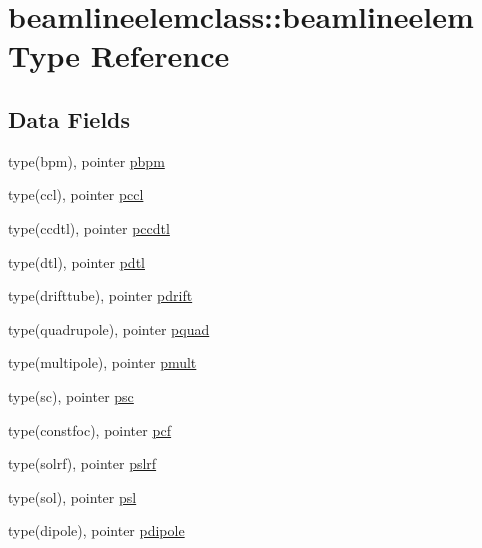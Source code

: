 \hypertarget{structbeamlineelemclass_1_1beamlineelem}{}\section{beamlineelemclass\+::beamlineelem Type Reference}
\label{structbeamlineelemclass_1_1beamlineelem}
\subsection*{Data Fields}
\begin{DoxyCompactItemize}
\item 
type(bpm), pointer \mbox{\hyperlink{structbeamlineelemclass_1_1beamlineelem_ab1486848bf9231eeed15a83170442e32}{pbpm}}
\item 
type(ccl), pointer \mbox{\hyperlink{structbeamlineelemclass_1_1beamlineelem_ac12416dfd09e0a7195c5297b12c1194f}{pccl}}
\item 
type(ccdtl), pointer \mbox{\hyperlink{structbeamlineelemclass_1_1beamlineelem_afc03034604a05eb1bc374945e4ab176d}{pccdtl}}
\item 
type(dtl), pointer \mbox{\hyperlink{structbeamlineelemclass_1_1beamlineelem_a8efdbd654fcb17a5dcf4826638e79720}{pdtl}}
\item 
type(drifttube), pointer \mbox{\hyperlink{structbeamlineelemclass_1_1beamlineelem_a295bb7932c8566c26f980d0bd89d2f7d}{pdrift}}
\item 
type(quadrupole), pointer \mbox{\hyperlink{structbeamlineelemclass_1_1beamlineelem_a4dc5bf2560031246e9c34bc11576b75c}{pquad}}
\item 
type(multipole), pointer \mbox{\hyperlink{structbeamlineelemclass_1_1beamlineelem_aa189f35902f7b7265e0485c363023f28}{pmult}}
\item 
type(sc), pointer \mbox{\hyperlink{structbeamlineelemclass_1_1beamlineelem_ad948a3ca9b39d5bc89fabe69a16b26f2}{psc}}
\item 
type(constfoc), pointer \mbox{\hyperlink{structbeamlineelemclass_1_1beamlineelem_a39cb4d5220b28f075e92fd09819f86ce}{pcf}}
\item 
type(solrf), pointer \mbox{\hyperlink{structbeamlineelemclass_1_1beamlineelem_ae4662d217dff6d83c07fe77d93525c61}{pslrf}}
\item 
type(sol), pointer \mbox{\hyperlink{structbeamlineelemclass_1_1beamlineelem_a227ca9307b3706cafe607d50bc6efaec}{psl}}
\item 
type(dipole), pointer \mbox{\hyperlink{structbeamlineelemclass_1_1beamlineelem_a2427f96729e2667041326c4dcf583b82}{pdipole}}

\end{DoxyCompactItemize}
